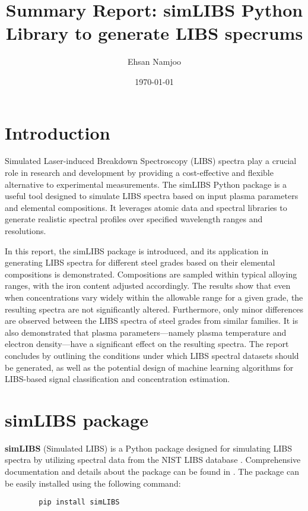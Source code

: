 \documentclass[12pt,a4paper]{article}
\title{Summary Report: simLIBS Python Library to generate LIBS specrums}
\author{Ehsan Namjoo}
\date{\today}
\begin{document}
	
	\maketitle
	\tableofcontents
	\newpage
	\section{Introduction}
	Simulated Laser-induced Breakdown Spectroscopy (LIBS) spectra play a crucial role in research and development by providing a cost-effective and flexible alternative to experimental measurements. The simLIBS Python package is a useful tool designed to simulate LIBS spectra based on input plasma parameters and elemental compositions. It leverages atomic data and spectral libraries to generate realistic spectral profiles over specified wavelength ranges and resolutions.
	
	In this report, the simLIBS package is introduced, and its application in generating LIBS spectra for different steel grades based on their elemental compositions is demonstrated. Compositions are sampled within typical alloying ranges, with the iron content adjusted accordingly. The results show that even when concentrations vary widely within the allowable range for a given grade, the resulting spectra are not significantly altered. Furthermore, only minor differences are observed between the LIBS spectra of steel grades from similar families. It is also demonstrated that plasma parameters—namely plasma temperature and electron density—have a significant effect on the resulting spectra. The report concludes by outlining the conditions under which LIBS spectral datasets should be generated, as well as the potential design of machine learning algorithms for LIBS-based signal classification and concentration estimation. 
	
	\section{simLIBS package}
	\textbf{simLIBS} (Simulated LIBS) is a Python package designed for simulating LIBS spectra by utilizing spectral data from the NIST LIBS database \cite{NIST_LIBS}. Comprehensive documentation and details about the package can be found in \cite{simLIBS2024}. The package can be easily installed using the following command:
	
	\vspace{-0.5em}
	\begin{verbatim}
		pip install simLIBS
	\end{verbatim}
	\vspace{-1.5em}
	
\end{document}
